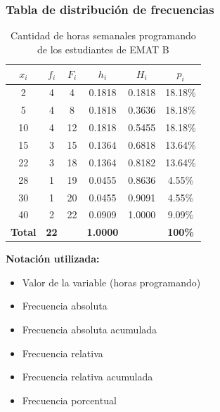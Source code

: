 \documentclass[12pt,letterpaper]{article}
\begin{document}
\vspace{0.8cm}

\subsubsection{Tabla de distribución de frecuencias}

\begin{table}[H]
    \centering
    \caption{Cantidad de horas semanales programando de los estudiantes de EMAT B}
    \vspace{1em}
    \label{tab:horas-programando}
    \begin{tabular}{@{}cccccc@{}}
        \toprule
        $x_i$ & $f_i$ & $F_i$ & $h_i$ & $H_i$ & $p_i$ \\
        \midrule
        2   & 4 & 4  & 0.1818 & 0.1818 & 18.18\% \\
        5   & 4 & 8  & 0.1818 & 0.3636 & 18.18\% \\
        10  & 4 & 12 & 0.1818 & 0.5455 & 18.18\% \\
        15  & 3 & 15 & 0.1364 & 0.6818 & 13.64\% \\
        22  & 3 & 18 & 0.1364 & 0.8182 & 13.64\% \\
        28  & 1 & 19 & 0.0455 & 0.8636 & 4.55\% \\
        30  & 1 & 20 & 0.0455 & 0.9091 & 4.55\% \\
        40  & 2 & 22 & 0.0909 & 1.0000 & 9.09\% \\
        \midrule
        \textbf{Total} & \textbf{22} & & \textbf{1.0000} & & \textbf{100\%} \\
        \bottomrule
    \end{tabular}
\end{table}

\noindent\textbf{Notación utilizada:}
\begin{itemize}[leftmargin=2cm, nosep]
    \item[$x_i$] Valor de la variable (horas programando)
    \item[$f_i$] Frecuencia absoluta
    \item[$F_i$] Frecuencia absoluta acumulada
    \item[$h_i$] Frecuencia relativa
    \item[$H_i$] Frecuencia relativa acumulada
    \item[$p_i$] Frecuencia porcentual
\end{itemize}
\end{document}
